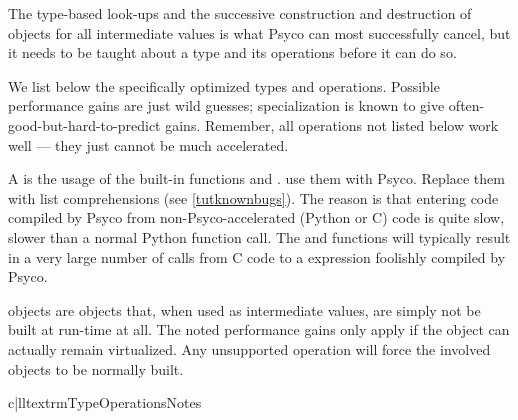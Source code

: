 \documentclass{manual}
\begin{document}
The type-based look-ups and the successive construction and destruction of objects for all intermediate values is what Psyco can most successfully cancel, but it needs to be taught about a type and its operations before it can do so.

We list below the specifically optimized types and operations.  Possible performance gains are just wild guesses; specialization is known to give often-good-but-hard-to-predict gains.  Remember, all operations not listed below work well --- they just cannot be much accelerated.

A  is the usage of the built-in functions  and .   use them with Psyco.  Replace them with list comprehensions (see \ref{tutknownbugs}).  The reason is that entering code compiled by Psyco from non-Psyco-accelerated (Python or C) code is quite slow, slower than a normal Python function call.  The  and  functions will typically result in a very large number of calls from C code to a  expression foolishly compiled by Psyco.

 objects are objects that, when used as intermediate values, are simply not be built at run-time at all.  The noted performance gains only apply if the object can actually remain virtualized.  Any unsupported operation will force the involved objects to be normally built.

\begin{tableiii}{c|ll}{textrm}{Type}{Operations}{Notes}















\end{tableiii}
\end{document}
